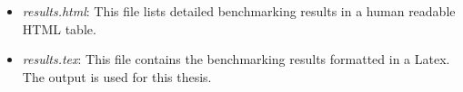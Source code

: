 \begin{itemize}
\begin{itemize}
	\item \textit{results.html}: This file lists detailed benchmarking results in a human readable HTML table. 
	
	\item \textit{results.tex}: This file contains the benchmarking results formatted in a Latex. The output is used for this thesis.
	\end{itemize}

\end{itemize}

